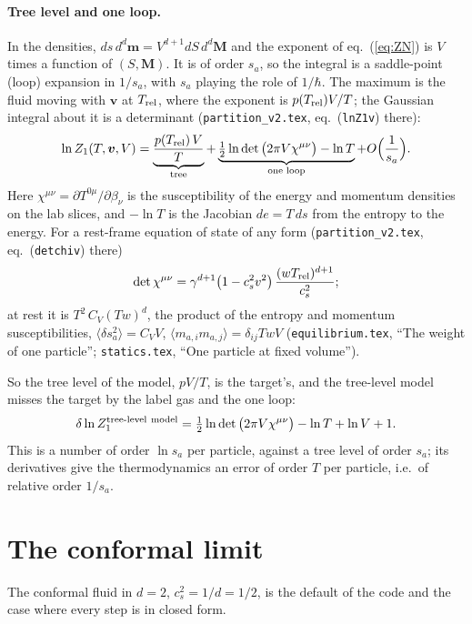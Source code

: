 \documentclass[11pt,aps,preprint,nofootinbib,superscriptaddress,tightenlines]{revtex4-2}
\newcommand{\avg}[1]{\langle #1\rangle}
\def\st{\begin{equation}}
\def\stp{\end{equation}}
\def\Eq#1{eq.~(\ref{#1})}
\let\oldparagraph\paragraph
\renewcommand{\paragraph}{\par\bigskip\oldparagraph}
\begin{document}
\paragraph{Tree level and one loop.}  In the densities, $ds\,d^d\bm m=V^{d+1}dS\,d^d\bm M$ and the exponent of \Eq{eq:ZN} is $V$ times a function of
$(S,\bm M)$.  It is of order $s_a$, so the integral is a saddle-point (loop) expansion in $1/s_a$, with $s_a$ playing the role of $1/\hbar$.  The maximum is
the fluid moving with $\bm v$ at $T_{\rm rel}$, where the exponent is $p(T_{\rm rel})V/T$; the Gaussian integral about it is a determinant
(\nolinkurl{partition_v2.tex}, eq.~(\texttt{lnZ1v}) there):
\st
\ln Z_1(T,\bm v,V)=\underbrace{\frac{p(T_{\rm rel})\,V}{T}}_{\text{tree}}+\underbrace{\tfrac12\ln\det\big(2\pi V\chi^{\mu\nu}\big)-\ln T}_{\text{one loop}}
+O\Big(\frac1{s_a}\Big) .
\label{eq:oneloop}
\stp
Here $\chi^{\mu\nu}=\partial T^{0\mu}/\partial\beta_\nu$ is the susceptibility of the energy and momentum densities on the lab slices, and $-\ln T$
is the Jacobian $de=T\,ds$ from the entropy to the energy.  For a rest-frame equation of state of any form
(\nolinkurl{partition_v2.tex}, eq.~(\texttt{detchiv}) there)
\st
\det\chi^{\mu\nu}=\gamma^{d+1}\big(1-c_s^2v^2\big)\,\frac{(wT_{\rm rel})^{d+1}}{c_s^2} ;
\label{eq:detchi}
\stp
at rest it is $T^2\,C_V(Tw)^d$, the product of the entropy and momentum susceptibilities, $\avg{\delta s_a^2}=C_VV$,
$\avg{m_{a,i}m_{a,j}}=\delta_{ij}TwV$ (\nolinkurl{equilibrium.tex}, ``The weight of one particle''; \nolinkurl{statics.tex}, ``One particle at fixed
volume'').

So the tree level of the model, $p V/T$, is the target's, and the tree-level model misses the target by the label gas and the one loop:
\st
\delta\ln Z_1^{\rm tree\text{-}level\ model}=\tfrac12\ln\det\big(2\pi V\chi^{\mu\nu}\big)-\ln T+\ln V+1 .
\label{eq:dlnZ}
\stp
This is a number of order $\ln s_a$ per particle, against a tree level of order $s_a$; its derivatives give the thermodynamics an error of order $T$
per particle, i.e.\ of relative order $1/s_a$.

\section{The conformal limit}
\label{sec:conformal}

The conformal fluid in $d=2$, $c_s^2=1/d=1/2$, is the default of the code and the case where every step is in closed form.
\end{document}
